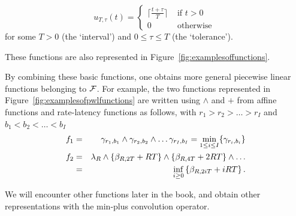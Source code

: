 %
%
\begin{definition}
$$ u_{T, \tau}(t) = \left\{ \begin{array}{ll} \lceil \frac{t+ \tau}{T} \rceil & \mbox{ if } t > 0 \\
                    0 & \mbox{ otherwise }
\end{array}
\right.
$$
for some $T > 0$ (the `interval') and $ 0 \leq \tau \leq T$ (the `tolerance').
\end{definition}

These functions are also represented in Figure~\ref{fig:examplesoffunctions}.
\begin{figure}[!htbp]
\end{figure}
By combining these basic functions, one obtains more general piecewise linear functions belonging
to $\mathcal F$. For example, the two functions represented in Figure~\ref{fig:examplesofpwlfunctions}
are written using $\wedge$ and $+$ from affine functions and rate-latency functions as follows,
with $r_1 > r_2 > \ldots > r_I$ and $b_1 < b_2 < \ldots < b_I$
\begin{eqnarray}
\mylabel{eq:pwlconcave}
f_1 & = & \gamma_{r_1,b_1} \wedge  \gamma_{r_2,b_2} \wedge \ldots \gamma_{r_I,b_I} %
   =   \min_{1 \leq i \leq I} \{ \gamma_{r_i,b_i} \} \\
\mylabel{eq:pwlsubadditive} f_2 & = & \lambda_R \wedge \{
\beta_{R,2T} + RT \} \wedge  \{ \beta_{R,4T} + 2RT\} \wedge \ldots
\nonumber \\
    & = &  \inf_{i \geq 0} \left\{  \beta_{R,2iT} + iRT \right\}.
\end{eqnarray}
\begin{figure}[!htbp]
\end{figure}
We will encounter other functions later in the book, and obtain
other representations with the min-plus convolution operator.
